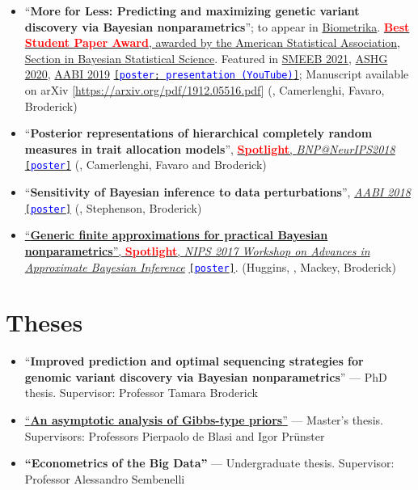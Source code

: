 \documentclass[10pt, a4paper]{article}
\newcommand{\years}[1]{\marginnote{\scriptsize #1}}
\begin{document}
\begin{itemize}
	\item ``\textbf{More for Less: Predicting and maximizing genetic variant discovery via Bayesian nonparametrics}''; to appear in \href{https://academic.oup.com/biomet/advance-article-abstract/doi/10.1093/biomet/asab012/6146908?redirectedFrom=PDF}{Biometrika}.  \href{https://community.amstat.org/sbss/home}{\textbf{\textcolor{red}{Best Student Paper Award}}, awarded by the American Statistical Association, Section in Bayesian Statistical Science}. Featured in \href{https://liphlab.github.io/SMEEB2021/files/SMEEB2021_abstract_booklet.pdf}{SMEEB 2021}, \href{https://www.ashg.org/meetings/2020meeting}{ASHG 2020},  \href{https://openreview.net/pdf?id=B1l8tyhEYr}{AABI 2019} \href{https://lorenzomasoero.com/files/more_poster.pdf}{\texttt{[\textcolor{blue}{poster}; \href{https://www.youtube.com/watch?v=OQzyWf-OXK4&ab_channel=TamaraBroderick}{\textcolor{blue}{presentation (YouTube)}}]}}; Manuscript available on arXiv [\url{https://arxiv.org/pdf/1912.05516.pdf}] (\mm, Camerlenghi, Favaro, Broderick)
	\item``\textbf{Posterior representations of hierarchical completely random measures in trait allocation models}'', \href{https://sites.google.com/view/nipsbnp2018/accepted-papers}{\textcolor{red}{\textbf{Spotlight}}, \emph{BNP@NeurIPS2018}} \href{https://lorenzomasoero.com/files/bnp_neurips_2018_poster.pdf}{\texttt{[\textcolor{blue}{poster}]}}  (\mm, Camerlenghi, Favaro and Broderick)
 	\item ``\textbf{Sensitivity of Bayesian inference to data perturbations}'', \href{http://approximateinference.org/accepted/}{\emph{AABI 2018}} \href{https://lorenzomasoero.com/files/aabi_2018_poster.pdf}{\texttt{[\textcolor{blue}{poster}]}} (\mm, Stephenson, Broderick)
\item \href{http://www.approximateinference.org/2017/accepted/HugginsEtAl2017.pdf}{``\textbf{Generic finite approximations
for practical Bayesian nonparametrics}'', \textcolor{red}{\textbf{Spotlight}}, \emph{NIPS 2017 Workshop on Advances in Approximate Bayesian Inference}} \href{https://lorenzomasoero.com/files/aabi_2017_poster.pdf}{\texttt{[\textcolor{blue}{poster}]}}.  (Huggins, \mm, Mackey, Broderick)
\end{itemize}
\section*{Theses}
\begin{itemize}
\item ``\textbf{Improved prediction and optimal sequencing strategies for genomic variant discovery via Bayesian nonparametrics}'' --- PhD thesis. Supervisor: Professor Tamara Broderick
\item \href{http://www.mit.edu/~lom/files/MasterThesisShort.pdf}{``\textbf{An asymptotic analysis of Gibbs-type priors}''} --- Master's thesis. Supervisors: Professors Pierpaolo de Blasi and Igor Pr\"{u}nster 
\item \textbf{``Econometrics of the Big Data''} --- Undergraduate thesis. Supervisor: Professor Alessandro Sembenelli
\end{itemize}
\newpage 
\end{document}
